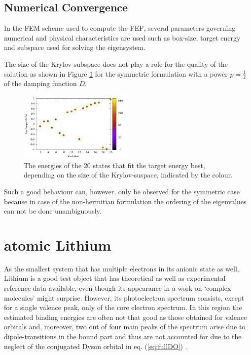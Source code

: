 \subsection{Numerical Convergence}
In the FEM scheme used to compute the FEF, several parameters governing numerical and physical characteristics are used such as box-size, target energy and subspace used for solving the eigensystem.

The size of the Krylov-subspace does not play a role for the quality of the solution as shown in Figure \ref{fig:E_nev} for the symmetric formulation with a power $p=\frac 12$ of the damping function $D$.
\begin{figure}
\includegraphics[width=0.5\textwidth]{Figures/Root_E_nev.pdf}
\caption{The energies of the 20 states that fit the target energy best, depending on the
size of the Krylov-suspace, indicated by the colour.}
\label{fig:E_nev}
\end{figure}
Such a good behaviour can, however, only be observed for the symmetric case because in case of the non-hermitian formulation the ordering of the eigenvalues can not be done unambiguously.

\section{atomic Lithium}
\label{ch:resLI}
As the smallest system that has multiple electrons in its anionic state as well, Lithium is a good test object that has theoretical as well as experimental reference data available, \cite{Li-R,Li-R1, LiNaRef1} even though its appearance in a work on `complex molecules' might surprise.
However, its photoelectron spectrum consists, except for a single valence peak, only of the core electron spectrum.
In this region the estimated binding energies are often not that good as those obtained for valence orbitals and, moreover, two out of four main peaks of the spectrum arise due to dipole-transitions in the bound part and thus are not accounted for due to the neglect of the conjugated Dyson orbital in eq. (\ref{eq:fullDO}) \cite{saPonzi}.
%

